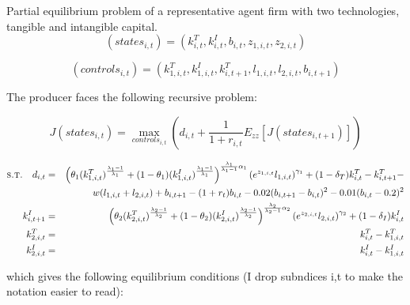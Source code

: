 \documentclass{article}
\begin{document}
Partial equilibrium problem of a representative agent firm with two technologies, tangible and intangible capital.
$$ (states_{i,t}) = (k_{i,t}^T,k_{i,t}^I,b_{i,t},z_{1,i,t},z_{2,i,t})$$

$$ (controls_{i,t}) = (k_{1,i,t}^T, k_{1,i,t}^I, k_{i,t+1}^T, l_{1,i,t},l_{2,i,t}, b_{i,t+1}) $$

The producer faces the following recursive problem:

$$ J(states_{i,t}) = \max_{ controls_{i,t} } \left( d_{i,t} + \frac{1}{1+r_{i,t}}  E_{zz} \left[ J(states_{i,t+1}) \right]  \right) $$

\begin{eqnarray*}
 \textsc{s.t.} \quad d_{i,t} &=& \left( \theta_1 (k_{1,i,t}^T)^{\frac{\lambda_1-1}{\lambda_1}} +(1-\theta_1)(k_{1,i,t}^I)^{\frac{\lambda_1-1}{\lambda_1}} \right)^{\frac{\lambda_1}{\lambda_1-1}\alpha_1} \left( e^{z_{1,i,t}}l_{1,i,t} \right)^{\gamma_1} + (1-\delta_T)k_{i,t}^T - k_{i,t+1}^T -\\
 & & w (l_{1,i,t} + l_{2,i,t}) + b_{i,t+1} - (1+r_t)b_{i,t} - 0.02(b_{i,t+1}-b_{i,t})^2 -0.01(b_{i,t}-0.2)^2 \\
 k_{i,t+1}^I & = & \left( \theta_2 (k_{2,i,t}^T)^{\frac{\lambda_2-1}{\lambda_2}} +(1-\theta_2)(k_{2,i,t}^I)^{\frac{\lambda_2-1}{\lambda_2}} \right)^{\frac{\lambda_2}{\lambda_2-1}\alpha_2}\left( e^{z_{2,i,t}}l_{2,i,t} \right)^{\gamma_2} + (1-\delta_I)k_{i,t}^I \\
 k_{2,i,t}^T  & = & k_{i,t}^T - k_{1,i,t}^T  \\
 k_{2,i,t}^I  & = & k_{i,t}^I - k_{1,i,t}^I  \\
\end{eqnarray*}

which gives the following equilibrium conditions (I drop subndices i,t to make the notation easier to read):
\end{document}
